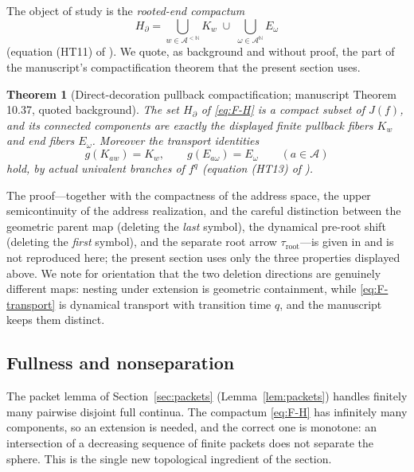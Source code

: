 \documentclass[11pt,reqno]{amsart}
\newtheorem{theorem}{Theorem}[section]
\theoremstyle{definition}
\theoremstyle{remark}
\begin{document}
The object of study is the \emph{rooted-end compactum}
\begin{equation}\label{eq:F-H}
H_\partial
=\bigcup_{w\in\mathcal A^{<\mathbb N}}K_w
\;\cup\;
\bigcup_{\omega\in\mathcal A^{\mathbb N}}E_\omega
\end{equation}
(equation (HT11) of \cite{MWman}).  We quote, as background and without
proof, the part of the manuscript's compactification theorem that the
present section uses.

\begin{theorem}[Direct-decoration pullback compactification; manuscript
Theorem 10.37, quoted background]\label{thm:F-compactification}
The set $H_\partial$ of \eqref{eq:F-H} is a compact subset of $J(f)$, and
its connected components are exactly the displayed finite pullback fibers
$K_w$ and end fibers $E_\omega$.  Moreover the transport identities
\begin{equation}\label{eq:F-transport}
g(K_{aw})=K_w,
\qquad
g(E_{a\omega})=E_\omega
\qquad(a\in\mathcal A)
\end{equation}
hold, by actual univalent branches of $f^{q}$ (equation (HT13) of
\cite{MWman}).
\end{theorem}

The proof---together with the compactness of the address space, the upper
semicontinuity of the address realization, and the careful distinction
between the geometric parent map (deleting the \emph{last} symbol), the
dynamical pre-root shift (deleting the \emph{first} symbol), and the
separate root arrow $\tau_{\mathrm{root}}$---is given in
\cite[Theorem~10.37]{MWman} and is not reproduced here; the present
section uses only the three properties displayed above.  We note for
orientation that the two deletion directions are genuinely different
maps: nesting under extension is geometric containment, while
\eqref{eq:F-transport} is dynamical transport with transition time $q$,
and the manuscript keeps them distinct.

\subsection{Fullness and nonseparation}\label{subsec:F-fullness}

The packet lemma of Section~\ref{sec:packets}
(Lemma~\ref{lem:packets}) handles finitely many pairwise disjoint full
continua.  The compactum \eqref{eq:F-H} has infinitely many components,
so an extension is needed, and the correct one is monotone: an
intersection of a decreasing sequence of finite packets does not
separate the sphere.  This is the single new topological ingredient of
the section.
\end{document}
